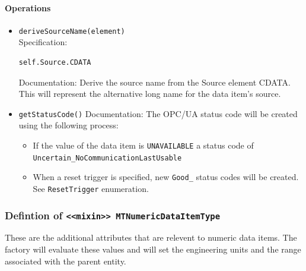 \paragraph{Operations}
\begin{itemize}
  \item \texttt{deriveSourceName(element)}\\
    Specification:
   \indent \begin{lstlisting}
self.Source.CDATA
\end{lstlisting}

    Documentation: Derive the source name from the Source element CDATA. This will represent the alternative long name for the data item's source.

  \item \texttt{getStatusCode()}
    Documentation: The OPC/UA status code will be created using the following process:

\begin{itemize}
  \item If the value of the data item is \texttt{UNAVAILABLE} a status code of \texttt{Uncertain_NoCommunicationLastUsable}
  \item When a reset trigger is specified, new \texttt{Good_} status codes will be created. See \texttt{ResetTrigger} enumeration.
\end{itemize}

\end{itemize}
\FloatBarrier
\subsubsection{Defintion of \texttt{<<mixin>> MTNumericDataItemType}} \label{type:MTNumericDataItemType}

\FloatBarrier

These are the additional attributes that are relevent to numeric data items. 
The factory will evaluate these values and will set the engineering units and the 
range associated with the parent entity.

